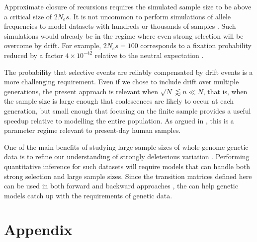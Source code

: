 \documentclass[review]{elsarticle}
\begin{document}
Approximate closure of recursions requires the simulated sample size to be above a critical size of $2N_e s.$ 
It is not uncommon to perform simulations of allele frequencies to model datasets with hundreds or 
thousands of samples \cite{Gravel:2011bg, Tennessen:2012ck}. 
Such simulations would already be in the regime where even strong selection will be overcome by drift. For
example, $2N_e s = 100$ corresponds to a fixation probability reduced by a factor $4\times 10^{-42}$ relative 
to the neutral expectation \cite{Kimura:1962um}. 
 
The probability that selective events are reliably compensated by drift events is a more challenging requirement. 
Even if we chose to include drift over multiple generations, the present approach is relevant when 
$\sqrt{N}\lessapprox n \ll N$, that is, when the sample size is large enough that coalescences  are likely to
occur at each generation, but small enough that focusing on the finite sample provides a useful speedup 
relative to modelling the entire population. As argued in \citep{BhaskarEtAl2014},  this is a parameter regime
 relevant to present-day human samples.  

One of the main benefits of studying large sample sizes of whole-genome
genetic data is to refine our understanding of strongly deleterious variation \cite{karczewski2020mutational}. Performing 
quantitative inference for such datasets will require models that can handle both strong selection and large sample sizes.  
Since the transition matrices defined here can be used in both forward \citep{JouganousEtAl2017} 
and backward approaches \cite{KammEtAl2017}, the can help genetic models catch up with the requirements of genetic data.




\section{Appendix}
\renewcommand{\thefigure}{S\arabic{figure}}
\setcounter{figure}{0}

\end{document}

